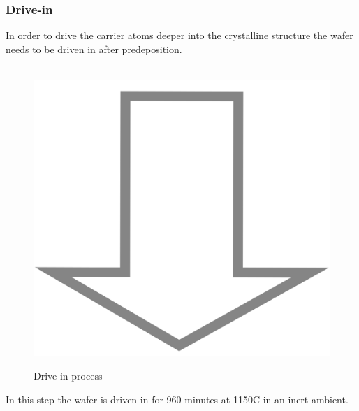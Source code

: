 \subsubsection{Drive-in}
In order to drive the carrier atoms deeper into the crystalline structure the wafer needs to be driven in after predeposition.
\begin{figure}[H]
	\centering
	\begin{tikzpicture}[node distance = 3cm, auto, thick,scale=\CrossSectionOnly, every node/.style={transform shape}]
		
	\end{tikzpicture} \\
	\includegraphics[scale=0.01]{down_arrow.png} \\
	\begin{tikzpicture}[node distance = 3cm, auto, thick,scale=\CrossSectionOnly, every node/.style={transform shape}]
		
	\end{tikzpicture}
	\caption{Drive-in process}
\end{figure}
In this step the wafer is  driven-in for 960 minutes at 1150\degree C in an inert ambient.

